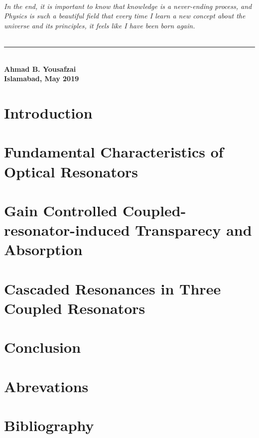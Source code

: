 \documentclass[12pt,twoside]{report}
\begin{document}
\subparagraph*{ \normalfont	In the end, it is important to know that knowledge is a never-ending process, and Physics is such a beautiful field that every time I learn a new concept about the universe and its principles, it feels like I have been born again.} 
\begin{flushleft}
\noindent\rule{5cm}{0.5pt}\\
\textbf{\small Ahmad B. Yousafzai}\\
\textbf{\small Islamabad, May 2019}
\end{flushleft}


\begin{scriptsize}
\small \tableofcontents
\end{scriptsize}
\small \listoffigures
\newpage
{}
\fancyhead[RO,LE]{}
\fancyfoot[LE,RO]{\thepage}
\renewcommand{\footrulewidth}{0.5pt}

\pagestyle{fancy}

\chapter{Introduction}

 
\chapter{Fundamental Characteristics of Optical Resonators}

 
\chapter{Gain Controlled Coupled-resonator-induced Transparecy and Absorption}

 
\chapter{Cascaded Resonances in Three Coupled Resonators}


\chapter{Conclusion}

\appendix
\chapter{Abrevations}


\chapter{Bibliography}

\end{document}
